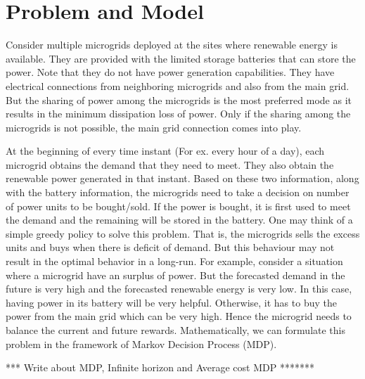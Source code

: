\section{Problem and Model}

Consider multiple microgrids deployed at the sites where renewable energy is available. They are provided with the limited storage batteries that can store the power. Note that they do not have power generation capabilities. They have electrical connections from neighboring microgrids and also from the main grid. But the sharing of power among the microgrids is the most preferred mode as it results in the minimum dissipation loss of power. Only if the sharing among the microgrids is not possible, the main grid connection comes into play. 

At the beginning of every time instant (For ex. every hour of a day), each microgrid obtains the demand that they need to meet. They also obtain the renewable power generated in that instant. Based on these two information, along with the battery information, the microgrids need to take a decision on number of power units to be bought/sold. If the power is bought, it is first used to meet the demand and the remaining will be stored in the battery. One may think of a simple greedy policy to solve this problem. That is, the microgrids sells the excess units and buys when there is deficit of demand. But this behaviour may not result in the optimal behavior in a long-run. For example, consider a situation where a microgrid have an surplus of power. But the forecasted demand in the future is very high and the forecasted renewable energy is very low. In this case, having power in its battery will be very helpful. Otherwise, it has to buy the power from the main grid which can be very high. Hence the microgrid needs to balance the current and future rewards. Mathematically, we can formulate this problem in the framework of Markov Decision Process (MDP).

*** Write about MDP, Infinite horizon and Average cost MDP *******

